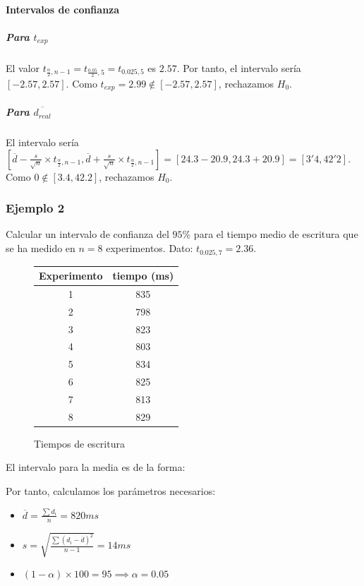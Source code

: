 \documentclass[12pt,spanish]{article}
\begin{document}
\paragraph{Intervalos de confianza}

\subparagraph{Para $t_{exp}$}

El valor $t_{\frac{\alpha}{2},n-1}=t_{\frac{0.05}{2},5}=t_{0.025,5}$ es $2.57$. Por tanto, el intervalo sería $[-2.57,2.57]$. Como $t_{exp}=2.99 \not \in [-2.57,2.57]$, rechazamos $H_0$.

\subparagraph{Para $\overline{d_{real}}$}

El intervalo sería $[\overline{d}-\frac{s}{\sqrt{n}} \times t_{\frac{\alpha}{2},n-1}, \overline{d}+\frac{s}{\sqrt{n}} \times t_{\frac{\alpha}{2},n-1}]= [24.3 - 20.9, 24.3 + 20.9] = [3'4, 42'2]$. Como $0 \not \in [3.4, 42.2]$, rechazamos $H_0$.

\subsubsection{Ejemplo 2}
Calcular un intervalo de confianza del $95\%$ para el tiempo medio de escritura que se ha medido en $n=8$ experimentos. Dato: $t_{0.025,7}=2.36$.
\begin{figure}[H]
	\centering
	\begin{tabular}{|c|c|}
		\hline
		Experimento & tiempo (ms)\\
		\hline
		1 & 835 \\
		\hline
		2 & 798 \\
		\hline
		3 & 823\\
		\hline
		4 & 803\\
		\hline
		5 & 834\\
		\hline
		6 & 825\\
		\hline
		7 & 813\\
		\hline
		8 & 829\\
		\hline
	\end{tabular}
	\caption{Tiempos de escritura}
\end{figure}

El intervalo para la media es de la forma:
\begin{equation*}
	[\overline{d}-\frac{s}{\sqrt{n}} \times t_{\frac{\alpha}{2},n-1}, \overline{d}+\frac{s}{\sqrt{n}} \times t_{\frac{\alpha}{2},n-1}]
\end{equation*}

Por tanto, calculamos los parámetros necesarios:
\begin{itemize}
	\item $\overline{d}=\frac{\sum{d_i}}{n}=820ms$
	\item $s=\sqrt{\frac{\sum{(d_i-\overline{d})^2}}{n-1}}=14ms$
	\item $(1-\alpha) \times 100 = 95 \implies \alpha=0.05$
\end{itemize}
\end{document}
